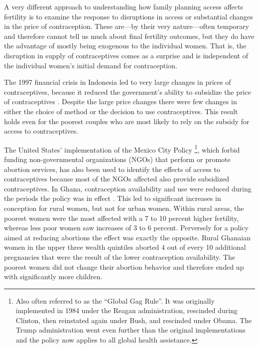 \documentclass[letterpaper,12pt]{article}
\begin{document}
A very different approach to understanding how family planning access
affects fertility is to examine the response to disruptions in access or
substantial changes in the price of contraception. 
These are---by their very nature---often temporary and therefore cannot
tell us much about final fertility outcomes, but they do have the
advantage of mostly being exogenous to the individual women. 
That is, the disruption in supply of contraceptives comes as a surprise
and is independent of the individual women's initial demand for
contraception.

The 1997 financial crisis in Indonesia led to very large changes in
prices of contraceptives, because it reduced the government's ability to
subsidize the price of contraceptives \citep{McKelvey2012}. 
Despite the large price changes there were few changes in either the
choice of method or the decision to use contraceptives. 
This result holds even for the poorest couples who are most likely to
rely on the subsidy for access to contraceptives.

The United States' implementation of the Mexico City Policy%
\footnote{
Also often referred to as the ``Global Gag Rule''. It was originally
implemented in 1984 under the Reagan administration, rescinded during
Clinton, then reinstated again under Bush, and rescinded under Obama. 
The Trump administration went even further than the original
implementations and the policy now applies to all global health
assistance.}, which forbid funding non-governmental organizations (NGOs)
that perform or promote abortion services, has also been used to
identify the effects of access to contraceptives because most of the
NGOs affected also provide subsidized contraceptives. 
In Ghana, contraception availability and use were reduced during the
periods the policy was in effect \citep{Jones2015}. 
This led to significant increases in conception for rural women, but not
for urban women. 
Within rural areas, the poorest women were the most affected with a 7 to
10 percent higher fertility, whereas less poor women saw increases of 3
to 6 percent. 
Perversely for a policy aimed at reducing abortions the effect was
exactly the opposite. 
Rural Ghanaian women in the upper three wealth quintiles aborted 4 out
of every 10 additional pregnancies that were the result of the lower
contraception availability. 
The poorest women did not change their abortion behavior and therefore
ended up with significantly more children.
\end{document}
